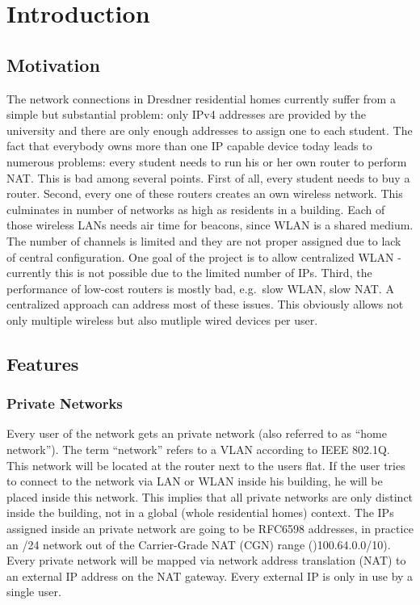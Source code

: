 \documentclass{report}
\begin{document}
 

\chapter{Introduction}\label{introduction}

\section{Motivation}\label{motivation}

The network connections in Dresdner residential homes currently suffer
from a simple but substantial problem: only IPv4 addresses are provided
by the university and there are only enough addresses to assign one to
each student. The fact that everybody owns more than one IP capable device
today leads to numerous problems: every student needs to run his or her own
router to perform NAT. This is bad among several points. First of all, every student needs to buy a router. Second,
every one of these routers creates an own wireless network. This culminates in
number of networks as high as residents in a building. Each of those
wireless LANs needs air time for beacons, since WLAN is a shared
medium\cite{FastWiFi}. The number of channels is limited and they are not proper
assigned due to lack of central configuration. One goal of
the project is to allow centralized WLAN - currently this is not possible due
to the limited number of IPs. Third, the performance of low-cost routers is
mostly bad, e.g.~slow WLAN, slow NAT. A centralized approach can address most of these
issues. This obviously allows not only multiple wireless but also mutliple wired devices per user.


\section{Features}\label{features}

\subsection{Private Networks}\label{private-networks}

Every user of the network gets an private network (also
referred to as ``home network''). The term ``network'' refers to a VLAN
according to IEEE 802.1Q\cite{802.1Q}. This network will be located at the router
next to the users flat. If the user tries to connect to the network via
LAN or WLAN inside his building, he will be placed inside this network. This
implies that all private networks are only distinct inside the building,
not in a global (whole residential homes) context. The IPs assigned inside an private network are
going to be RFC6598 addresses\cite{CGN}, in practice an /24 network out of the
Carrier-Grade NAT (CGN) range ()100.64.0.0/10). Every private network
will be mapped via network address translation (NAT\cite{NAT}) to an external IP
address on the NAT gateway. Every external IP is only in use by a single user.
\end{document}
